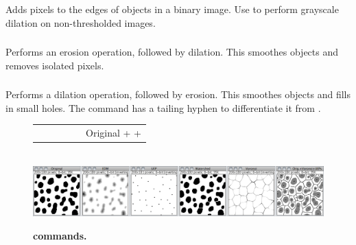 Adds pixels to the edges of objects in a binary image. Use 
to perform grayscale dilation on non-thresholded
images.




\subsubsection{\protect{}\label{sub:Open}}

Performs an erosion operation, followed by dilation. This smoothes
objects and removes isolated pixels.




\subsubsection{\protect{}\label{sub:Close--}}

Performs a dilation operation, followed by erosion. This smoothes
objects and fills in small holes. The command has a tailing hyphen
to differentiate it from 
.



\begin{figure}
\noindent \setlength{\tabcolsep}{0pt}%
\begin{tabular}{>{\centering}m{}>{\centering}m{}>{\centering}m{}>{\centering}m{}>{\centering}m{}>{\centering}m{}}
{\scriptsize Original} & {\scriptsize \nameref{sub:Distance-Map}} & {\scriptsize \nameref{sub:Ultimate-Points}} & {\scriptsize \nameref{sub:Watershed}} & {\scriptsize \nameref{sub:Voronoi}} & {\scriptsize Original + \nameref{sub:Voronoi} + \nameref{sub:Ultimate-Points}}\tabularnewline
\end{tabular}\\


\noindent \includegraphics[width=1\columnwidth]{images/BinaryCommands}\caption{\textbf{\protect{}
commands.}}
\end{figure}



